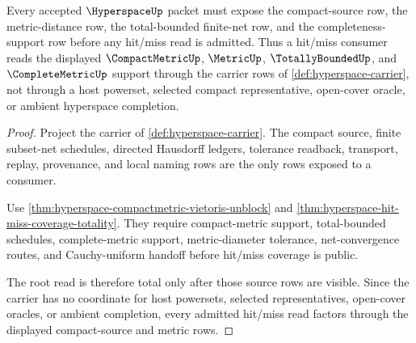 \begin{theorem}
\label{thm:hyperspace-root-compact-source-totality}
Every accepted $\HyperspaceUp$ packet must expose the compact-source row, the metric-distance row, the total-bounded finite-net row, and the completeness-support row before any hit/miss read is admitted. Thus a hit/miss consumer reads the displayed $\CompactMetricUp$, $\MetricUp$, $\TotallyBoundedUp$, and $\CompleteMetricUp$ support through the carrier rows of \autoref{def:hyperspace-carrier}, not through a host powerset, selected compact representative, open-cover oracle, or ambient hyperspace completion.
\end{theorem}
\begin{proof}
Project the carrier of \autoref{def:hyperspace-carrier}. The compact source, finite subset-net schedules, directed Hausdorff ledgers, tolerance readback, transport, replay, provenance, and local naming rows are the only rows exposed to a consumer.

Use \autoref{thm:hyperspace-compactmetric-vietoris-unblock} and \autoref{thm:hyperspace-hit-miss-coverage-totality}. They require compact-metric support, total-bounded schedules, complete-metric support, metric-diameter tolerance, net-convergence routes, and Cauchy-uniform handoff before hit/miss coverage is public.

The root read is therefore total only after those source rows are visible. Since the carrier has no coordinate for host powersets, selected representatives, open-cover oracles, or ambient completion, every admitted hit/miss read factors through the displayed compact-source and metric rows.
\end{proof}

